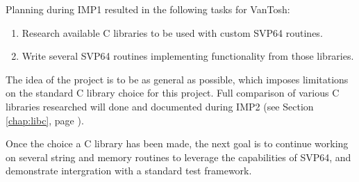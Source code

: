 Planning during \acrshort{IMP}1 resulted in the following tasks for VanTosh:

\begin{enumerate}
  \item Research available C libraries to be used with custom \acrshort{SVP64} routines.
  \item Write several \acrshort{SVP64} routines implementing functionality from those libraries.
\end{enumerate}

The idea of the project is to be as general as possible, which imposes limitations
on the standard C library choice for this project. Full comparison of various
C libraries researched will done and documented during \acrshort{IMP}2
(see Section \ref{chap:libc}, page \pageref{chap:libc}).

Once the choice a C library has been made, the next goal is to continue working on
several string and memory routines to leverage the capabilities of \acrshort{SVP64},
and demonstrate intergration with a standard test framework.

